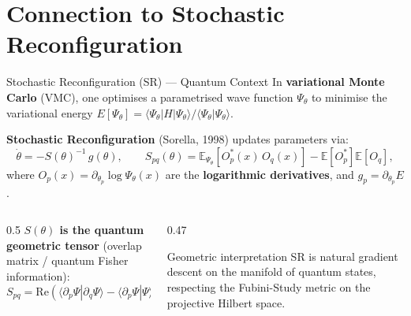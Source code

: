 \documentclass[aspectratio=169, 10pt]{beamer}
\newcommand{\E}{\mathbb{E}}
\begin{document}
\section{Connection to Stochastic Reconfiguration}

\begin{frame}{Stochastic Reconfiguration (SR) — Quantum Context}
  In \textbf{variational Monte Carlo} (VMC), one optimises a parametrised wave function $\Psi_\theta$ to minimise the variational energy $E[\Psi_\theta] = \langle\Psi_\theta|H|\Psi_\theta\rangle / \langle\Psi_\theta|\Psi_\theta\rangle$.

  \vspace{0.4em}
  \textbf{Stochastic Reconfiguration} (Sorella, 1998) updates parameters via:
  \[
    \boxed{\dot\theta = -S(\theta)^{-1}\, g(\theta)},
    \qquad
    S_{pq}(\theta) = \E_{\Psi_\theta}\!\left[O_p^*(x)\, O_q(x)\right] - \E[O_p^*]\E[O_q],
  \]
  where $O_p(x) = \partial_{\theta_p}\log\Psi_\theta(x)$ are the \textbf{logarithmic derivatives}, and $g_p = \partial_{\theta_p}E$.

  \begin{columns}[T]
    \begin{column}{0.5\textwidth}
      \textbf{$S(\theta)$ is the quantum geometric tensor} (overlap matrix / quantum Fisher information):
      \[
        S_{pq} = \mathrm{Re}\left(\langle\partial_p\Psi|\partial_q\Psi\rangle - \langle\partial_p\Psi|\Psi\rangle\langle\Psi|\partial_q\Psi\rangle\right).
      \]
    \end{column}
    \begin{column}{0.47\textwidth}
      \begin{exampleblock}{Geometric interpretation}
        SR is natural gradient descent on the manifold of quantum states, respecting the Fubini-Study metric on the projective Hilbert space.
      \end{exampleblock}
    \end{column}
  \end{columns}
\end{frame}
\end{document}

